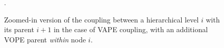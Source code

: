 \begin{figure}
  \centering

  \small

  \newcommand{\w}[1]{\textcolor{white}{#1}}
  \def\svgwidth{0.9\textwidth}


  \caption{Zoomed-in version of the coupling between a hierarchical level $i$ with its parent $i+1$ in the case of \textsf{VAPE} coupling, with an additional \textsf{VOPE} parent \textit{within} node $i$.}.
  \label{\figlabel}
\end{figure}
